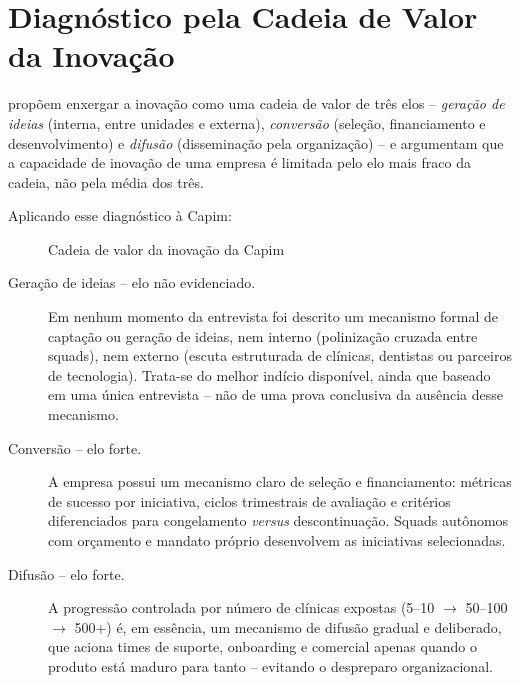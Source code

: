 \section{Diagnóstico pela Cadeia de Valor da Inovação}
\label{sec:cadeia-valor}

\textcite{hansenbirkinshaw2007} propõem enxergar a inovação como uma cadeia de valor de três elos -- \textit{geração de ideias} (interna, entre unidades e externa), \textit{conversão} (seleção, financiamento e desenvolvimento) e \textit{difusão} (disseminação pela organização) -- e argumentam que a capacidade de inovação de uma empresa é limitada pelo elo mais fraco da cadeia, não pela média dos três.

Aplicando esse diagnóstico à Capim:

\begin{figure}[h]
  \caption{Cadeia de valor da inovação da Capim}
  \label{fig:cadeia-valor}
  \centering
\end{figure}

\begin{description}
  \item[Geração de ideias -- elo não evidenciado.] Em nenhum momento da entrevista foi descrito um mecanismo formal de captação ou geração de ideias, nem interno (polinização cruzada entre squads), nem externo (escuta estruturada de clínicas, dentistas ou parceiros de tecnologia). Trata-se do melhor indício disponível, ainda que baseado em uma única entrevista -- não de uma prova conclusiva da ausência desse mecanismo.
  \item[Conversão -- elo forte.] A empresa possui um mecanismo claro de seleção e financiamento: métricas de sucesso por iniciativa, ciclos trimestrais de avaliação e critérios diferenciados para congelamento \textit{versus} descontinuação. Squads autônomos com orçamento e mandato próprio desenvolvem as iniciativas selecionadas.
  \item[Difusão -- elo forte.] A progressão controlada por número de clínicas expostas (5--10 $\rightarrow$ 50--100 $\rightarrow$ 500+) é, em essência, um mecanismo de difusão gradual e deliberado, que aciona times de suporte, onboarding e comercial apenas quando o produto está maduro para tanto -- evitando o despreparo organizacional.
\end{description}

